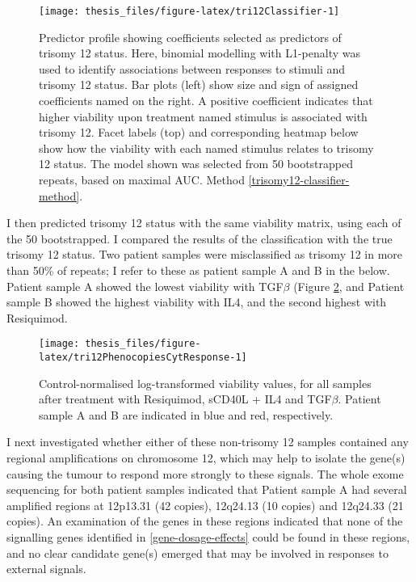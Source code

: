 \documentclass[11pt, a4paper, twosided]{book}
\begin{document}
\begin{figure}

{\centering \texttt{[image: thesis\_files/figure-latex/tri12Classifier-1]} 

}

\caption{Predictor profile showing coefficients selected as predictors of trisomy 12 status. Here, binomial modelling with L1-penalty was used to identify associations between responses to stimuli and trisomy 12 status. Bar plots (left) show size and sign of assigned coefficients named on the right. A positive coefficient indicates that higher viability upon treatment named stimulus is associated with trisomy 12. Facet labels (top) and corresponding heatmap below show how the viability with each named stimulus relates to trisomy 12 status. The model shown was selected from 50 bootstrapped repeats, based on maximal AUC. Method \ref{trisomy12-classifier-method}.}\label{fig:tri12Classifier}
\end{figure}
I then predicted trisomy 12 status with the same viability matrix, using each of the 50 bootstrapped. I compared the results of the classification with the true trisomy 12 status. Two patient samples were misclassified as trisomy 12 in more than 50\% of repeats; I refer to these as patient sample A and B in the below. Patient sample A showed the lowest viability with TGF\(\beta\) (Figure \ref{fig:tri12PhenocopiesCytResponse}, and Patient sample B showed the highest viability with IL4, and the second highest with Resiquimod.


\begin{figure}

{\centering \texttt{[image: thesis\_files/figure-latex/tri12PhenocopiesCytResponse-1]} 

}

\caption{Control-normalised log-transformed viability values, for all samples after treatment with Resiquimod, sCD40L + IL4 and TGF\(\beta\). Patient sample A and B are indicated in blue and red, respectively.}\label{fig:tri12PhenocopiesCytResponse}
\end{figure}
I next investigated whether either of these non-trisomy 12 samples contained any regional amplifications on chromosome 12, which may help to isolate the gene(s) causing the tumour to respond more strongly to these signals. The whole exome sequencing for both patient samples indicated that Patient sample A had several amplified regions at 12p13.31 (42 copies), 12q24.13 (10 copies) and 12q24.33 (21 copies). An examination of the genes in these regions indicated that none of the signalling genes identified in \ref{gene-dosage-effects} could be found in these regions, and no clear candidate gene(s) emerged that may be involved in responses to external signals.
\end{document}
